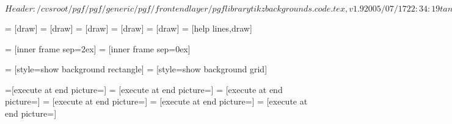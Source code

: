 \ProvidesPackageRCS[v\pgfversion] $Header: /cvsroot/pgf/pgf/generic/pgf/frontendlayer/pgflibrarytikzbackgrounds.code.tex,v 1.9 2005/07/17 22:34:19 tantau Exp $

%






= [draw]
=       [draw]
=    [draw]
=      [draw]
=     [draw]
=      [help lines,draw]

\def\tikz@framexsep{1ex}
\def\tikz@frameysep{1ex}

\def\tikz@outerframexsep{0ex}
\def\tikz@outerframeysep{0ex}



=     [inner frame sep=2ex]
=     [inner frame sep=0ex]




=                   [style=show background rectangle]
=                  [style=show background grid]

=[execute at end picture=\tikz@background@framed]
=      [execute at end picture=\tikz@background@top]
=   [execute at end picture=\tikz@background@bottom]
=     [execute at end picture=\tikz@background@left]
=    [execute at end picture=\tikz@background@right]
=     [execute at end picture=\tikz@background@grid]



